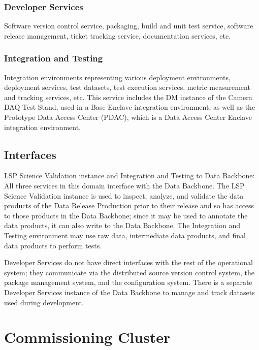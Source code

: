 \documentclass[DM,toc]{lsstdoc}
\begin{document}
\subsubsection{Developer Services}\label{developer-services}

Software version control service, packaging, build and unit test
service, software release management, ticket tracking service,
documentation services, etc.

\subsubsection{Integration and Testing}\label{integration-and-testing}

Integration environments representing various deployment environments,
deployment services, test datasets, test execution services, metric measurement
and tracking services, etc.  This service includes the DM instance of the
Camera DAQ Test Stand, used in a Base Enclave integration environment, as well
as the Prototype Data Access Center (PDAC), which is a Data Access Center
Enclave integration environment.

\subsection{Interfaces}\label{ncsa-ads-interfaces}

LSP Science Validation instance and Integration and Testing to Data Backbone:
All three services in this domain interface with the Data Backbone.  The LSP
Science Validation instance is used to inspect, analyze, and validate the data
products of the Data Release Production prior to their release and so has
access to those products in the Data Backbone; since it may be used to annotate
the data products, it can also write to the Data Backbone.  The Integration and
Testing environment may use raw data, intermediate data products, and final
data products to perform tests.

Developer Services do not have direct interfaces with the rest of the
operational system; they communicate via the distributed source version control
system, the package management system, and the configuration system.  There is
a separate Developer Services instance of the Data Backbone to manage and track
datasets used during development.


\section{Commissioning Cluster}\label{commissioning-cluster}
\end{document}
